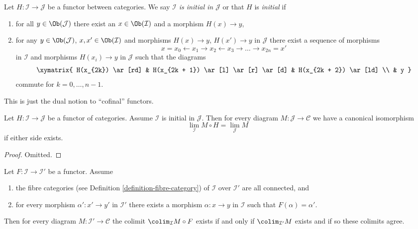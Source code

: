 \begin{definition}
\label{definition-initial}
Let $H : \mathcal{I} \to \mathcal{J}$ be a functor between categories.
We say {\it $\mathcal{I}$ is initial in $\mathcal{J}$} or that
$H$ is {\it initial} if
\begin{enumerate}
\item for all $y \in \Ob(\mathcal{J})$ there exist an
$x \in \Ob(\mathcal{I})$ and a morphism $H(x) \to y$,
\item for any $y \in \Ob(\mathcal{J})$, $x , x' \in \Ob(\mathcal{I})$ and
morphisms $H(x) \to y$, $H(x') \to y$ in $\mathcal{J}$
there exist a sequence of morphisms
$$
x = x_0 \leftarrow x_1 \rightarrow x_2 \leftarrow x_3 \rightarrow \ldots
\rightarrow x_{2n} = x'
$$
in $\mathcal{I}$ and morphisms $H(x_i) \to y$ in $\mathcal{J}$
such that the diagrams
$$
\xymatrix{
H(x_{2k}) \ar[rd] &
H(x_{2k + 1}) \ar[l] \ar[r] \ar[d] &
H(x_{2k + 2}) \ar[ld] \\
& y
}
$$
commute for $k = 0, \ldots, n - 1$.
\end{enumerate}
\end{definition}

\noindent
This is just the dual notion to ``cofinal'' functors.

\begin{lemma}
\label{lemma-initial}
Let $H : \mathcal{I} \to \mathcal{J}$ be a functor of categories.
Assume $\mathcal{I}$ is initial in $\mathcal{J}$.
Then for every diagram $M : \mathcal{J} \to \mathcal{C}$ we
have a canonical isomorphism
$$
\lim_\mathcal{I} M \circ H = \lim_\mathcal{J} M
$$
if either side exists.
\end{lemma}

\begin{proof}
Omitted.
\end{proof}

\begin{lemma}
\label{lemma-colimit-constant-connected-fibers}
Let $F : \mathcal{I} \to \mathcal{I}'$ be a functor.
Assume
\begin{enumerate}
\item the fibre categories (see
Definition \ref{definition-fibre-category})
of $\mathcal{I}$ over $\mathcal{I}'$ are all connected, and
\item for every morphism $\alpha' : x' \to y'$ in $\mathcal{I}'$ there
exists a morphism $\alpha : x \to y$ in $\mathcal{I}$ such that
$F(\alpha) = \alpha'$.
\end{enumerate}
Then for every diagram $M : \mathcal{I}' \to \mathcal{C}$
the colimit $\colim_\mathcal{I} M \circ F$ exists if and only
if $\colim_{\mathcal{I}'} M$ exists and if so these colimits
agree.
\end{lemma}

